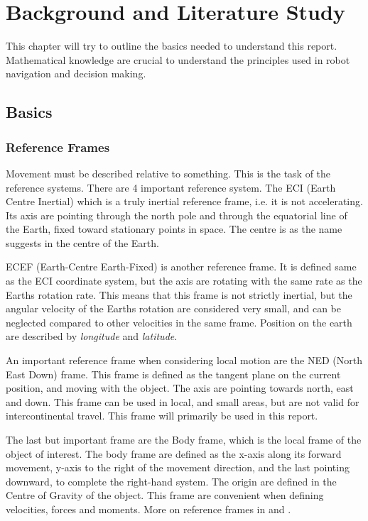 

\chapter{Background and Literature Study}
This chapter will try to outline the basics needed to understand this report. Mathematical
knowledge are crucial to understand the principles used in robot navigation and decision
making. 


\section{Basics}

\subsection{Reference Frames}
	Movement must be described relative to something. This is the task of the reference systems. There are
	4 important reference system. The ECI (Earth Centre Inertial) which is a truly inertial reference
	frame, i.e. it is not accelerating. Its axis are pointing through the north pole and through the
	equatorial line of the Earth, fixed toward stationary points in space. The centre is as the name
	suggests in the centre of the Earth. 
	
	ECEF (Earth-Centre Earth-Fixed) is another reference frame. It is defined same as the ECI coordinate
	system, but the axis are rotating with the same rate as the Earths rotation rate. This means that this frame
	is not
	strictly inertial, but the angular velocity of the Earths rotation are considered very small, and can
	be neglected compared to other velocities in the same frame. Position on the earth are described by
	\textit{longitude} and \textit{latitude}.

	An important reference frame when considering local motion are the NED (North East Down) frame. This
	frame is defined as the tangent plane on the current position, and moving with the object. The axis
	are pointing towards north, east and down. This frame can be used in local, and small areas, but are
	not valid for intercontinental travel. This frame will primarily be used in this report. 

	The last but important frame are the Body frame, which is the local frame of the object of interest.
	The body frame are defined as the x-axis along its forward movement, y-axis to the right of the
	movement direction, and the last pointing downward, to complete the right-hand system. The
	origin are defined in the Centre of Gravity of the object. This frame are convenient when
	defining velocities, forces and moments. More on reference frames in \cite{fossen} and
    \cite{forsell}.

